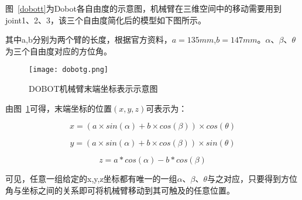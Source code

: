 图~\ref{dobott}为Dobot各自由度的示意图，机械臂在三维空间中的移动需要用到joint1、2、3，该三个自由度简化后的模型如下图所示。

其中a,b分别为两个臂的长度，根据官方资料，$a=135mm$,$b=147mm$。$\alpha$、$\beta$、$\theta$ 为三个自由度对应的方位角。

\begin{figure}[htbp]
\small
\centering
\texttt{[image: dobotg.png]}
\caption{DOBOT机械臂末端坐标表示示意图} 
\label{dobotg}
\end{figure}

由图~\ref{dobotg}可得，末端坐标的位置$(x,y,z)$可表示为：

\begin{equation}
x=(a \times sin(\alpha)+b \times cos(\beta)) \times cos(\theta)
\end{equation}

\begin{equation}
y=(a \times sin(\alpha)+b \times cos(\beta)) \times sin(\theta)
\end{equation}

\begin{equation}
z=a*cos(\alpha)-b*cos(\beta)
\end{equation}

可见，任意一组给定的x,y,z坐标都有唯一的一组$\alpha$、$\beta$、$\theta$与之对应，只要得到方位角与坐标之间的关系即可将机械臂移动到其可触及的任意位置。

